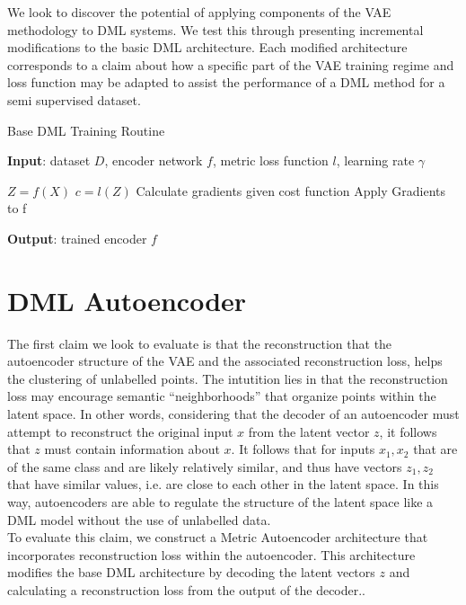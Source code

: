 \documentclass[./dissertation.tex]{subfiles}
\begin{document}
    We look to discover the potential of applying components of the VAE methodology to DML systems. We test this through presenting incremental modifications to the basic DML architecture. Each modified architecture corresponds to a claim about how a specific part of the VAE training regime and loss function may be adapted to assist the performance of a DML method for a semi supervised dataset. 
    
    \begin{algorithm}
    \caption{Base DML Training Routine}\label{alg:cap}
    \hspace*{\algorithmicindent} \textbf{Input}: dataset $D$, encoder network $f$, metric loss function $l$, learning rate $\gamma$
    \begin{algorithmic}[1]
        \State $Z = f(X)$
        \State $c = l(Z)$
        \State Calculate gradients given cost function
        \State Apply Gradients to f
    \EndFor
    \end{algorithmic}
    \hspace*{\algorithmicindent} \textbf{Output}: trained encoder $f$
    \end{algorithm}
    
    \section{DML Autoencoder}
    The first claim we look to evaluate is that the reconstruction that the autoencoder structure of the VAE and the associated reconstruction loss, helps the clustering of unlabelled points. The intutition lies in that the reconstruction loss may encourage semantic “neighborhoods” that organize points within the latent space. In other words, considering that the decoder of an autoencoder must attempt to reconstruct the original input $x$ from the latent vector $z$, it follows that $z$ must contain information about $x$. It follows that for inputs $x_{1}, x_{2}$ that are of the same class and are likely relatively similar, and thus have vectors $z_{1}, z_{2}$ that have similar values, i.e. are close to each other in the latent space. In this way, autoencoders are able to regulate the structure of the latent space like a DML model without the use of unlabelled data. \\
    
    To evaluate this claim, we construct a Metric Autoencoder architecture that incorporates reconstruction loss within the autoencoder. This architecture modifies the base DML architecture by decoding the latent vectors $z$ and calculating a reconstruction loss from the output of the decoder.. 
\end{document}
